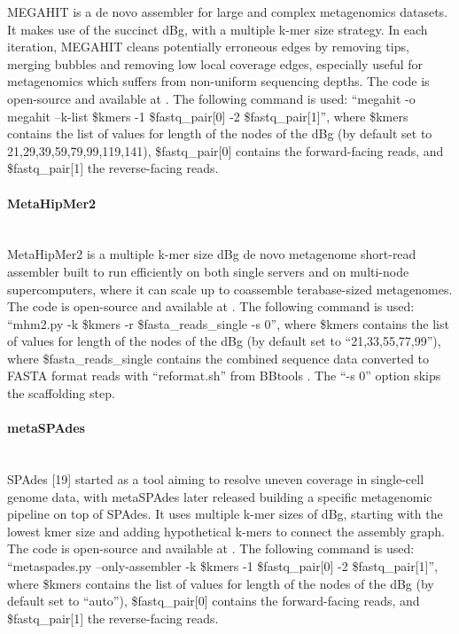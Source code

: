 MEGAHIT \cite{li_megahit_2015} is a de novo assembler for large and complex metagenomics datasets. It makes use of the succinct dBg, with a multiple k-mer size strategy. In each iteration, MEGAHIT cleans potentially erroneous edges by removing tips, merging bubbles and removing low local coverage edges, especially useful for metagenomics which suffers from non-uniform sequencing depths. The code is open-source and available at \cite{li_megahit_2022}. The following command is used: “megahit -o megahit --k-list \$kmers -1 \$fastq\_pair[0] -2 \$fastq\_pair[1]”, where \$kmers contains the list of values for length of the nodes of the dBg (by default set to 21,29,39,59,79,99,119,141), \$fastq\_pair[0] contains the forward-facing reads, and \$fastq\_pair[1] the reverse-facing reads.

\paragraph{MetaHipMer2} \mbox{}\\

MetaHipMer2 \cite{georganas_extreme_2018} is a  multiple k-mer size dBg de novo metagenome short-read assembler built to run efficiently on both single servers and on multi-node supercomputers, where it can scale up to coassemble terabase-sized metagenomes. The code is open-source and available at \cite{noauthor_berkeleylab_nodate}. The following command is used: “mhm2.py -k \$kmers -r \$fasta\_reads\_single -s 0”, where \$kmers contains the list of values for length of the nodes of the dBg (by default set to “21,33,55,77,99”), where \$fasta\_reads\_single contains the combined sequence data converted to FASTA format reads with “reformat.sh” from BBtools \cite{bushnell_bbmerge_2017}. The “-s 0” option skips the scaffolding step. 

\paragraph{metaSPAdes} \mbox{}\\

SPAdes [19] started as a tool aiming to resolve uneven coverage in single-cell genome data, with metaSPAdes \cite{nurk_metaspades_2017} later released building a specific metagenomic pipeline on top of SPAdes. It uses multiple k-mer sizes of dBg, starting with the lowest kmer size and adding hypothetical k-mers to connect the assembly graph. The code is open-source and available at \cite{noauthor_spades_nodate}. The following command is used: “metaspades.py --only-assembler -k \$kmers -1 \$fastq\_pair[0] -2 \$fastq\_pair[1]”, where \$kmers contains the list of values for length of the nodes of the dBg (by default set to “auto”), \$fastq\_pair[0] contains the forward-facing reads, and \$fastq\_pair[1] the reverse-facing reads.

